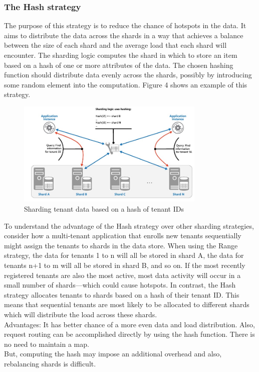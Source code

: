 \documentclass[10pt, conference]{IEEEtran}
\begin{document}
\subsubsection{The Hash strategy}
\indent The purpose of this strategy is to reduce the chance of hotspots in the data. It aims to distribute the data across the shards in a way that achieves a balance between the size of each shard and the average load that each shard will encounter. The sharding logic computes the shard in which to store an item based on a hash of one or more attributes of the data. The chosen hashing function should distribute data evenly across the shards, possibly by introducing some random element into the computation. Figure 4 shows an example of this strategy.\\
\begin{figure}[h!]
	\centering
	\includegraphics[width=9cm]{figure4.jpg}
	\caption{Sharding tenant data based on a hash of tenant IDs \cite{ref3}}
\end{figure} 
\indent To understand the advantage of the Hash strategy over other sharding strategies, consider how a multi-tenant application that enrolls new tenants sequentially might assign the tenants to shards in the data store. When using the Range strategy, the data for tenants 1 to n will all be stored in shard A, the data for tenants n+1 to m will all be stored in shard B, and so on. If the most recently registered tenants are also the most active, most data activity will occur in a small number of shards—which could cause hotspots. In contrast, the Hash strategy allocates tenants to shards based on a hash of their tenant ID. This means that sequential tenants are most likely to be allocated to different shards which will distribute the load across these shards.\\
\indent Advantages: It has better chance of a more even data and load distribution. Also, request routing can be accomplished directly by using the hash function. There is no need to maintain a map.\\
\indent But, computing the hash may impose an additional overhead and also, rebalancing shards is difficult.\\
\end{document}
